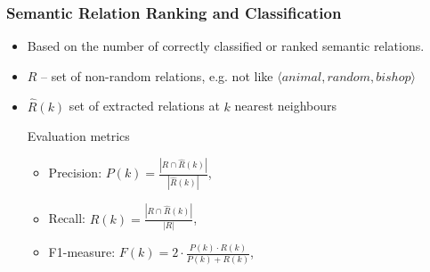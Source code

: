 \begin{frame}
\frametitle{Semantic Relation Ranking  and Classification}

\begin{itemize}
  
  \item Based on the number of  \alert{correctly classified or ranked} semantic relations.
  

\item $R$ -- set of non-random relations, e.g. not like $\langle animal, random, bishop \rangle$

\item $\hat{R}(k)$ set of extracted relations at $k$ nearest neighbours

\begin{block}{Evaluation metrics}

    
    \begin{itemize}
        \item Precision: $P(k)=$$\frac{|R \cap \hat{R}(k)|}{|\hat{R}(k)|}$,
        \item Recall: $R(k)=$$\frac{|R \cap \hat{R}(k)|}{|R|}$,
        \item F1-measure: $F(k)= 2 \cdot \frac{P(k) \cdot R(k)}{P(k) + R(k)}$,
    \end{itemize}   
    \end{block}

    

\end{itemize}
    
\end{frame}




